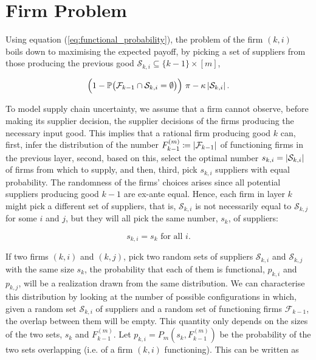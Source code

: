 \documentclass[../../main.tex]{subfiles}
\begin{document}
\section{Firm Problem}

Using equation (\ref{eq:functional_probability}), the problem of the firm $(k, i)$ boils down to maximising the expected payoff, by picking a set of suppliers from those producing the previous good $\mathcal{S}_{k, i} \subseteq \{k - 1\} \times [m]$, 

\begin{equation}
  \Big(1 - \mathbb{P}\big( \mathcal{F}_{k - 1} \cap \mathcal{S}_{k, i} = \emptyset \big) \Big) \ \pi  - \kappa \left\lvert\mathcal{S}_{k, i} \right\rvert.
\end{equation}


To model supply chain uncertainty, we assume that a firm cannot observe, before making its supplier decision, the supplier decisions of the firms producing the necessary input good. This implies that a rational firm producing good $k$ can, first, infer the distribution of the number $F^{(m)}_{k - 1} \coloneqq \left\lvert\mathcal{F}_{k - 1}\right\rvert$ of functioning firms in the previous layer, second, based on this, select the optimal number $s_{k, i} = \left\lvert\mathcal{S}_{k, i}\right\rvert$ of firms from which to supply, and then, third, pick $s_{k, i}$ suppliers with equal probability. The randomness of the firms' choices arises since all potential suppliers producing good $k - 1$ are ex-ante equal. Hence, each firm in layer $k$ might pick a different set of suppliers, that is, $\mathcal{S}_{k, i}$ is not necessarily equal to $\mathcal{S}_{k, j}$ for some $i$ and $j$, but they will all pick the same number, $s_k$, of suppliers:

\begin{equation}
  s_{k, i} = s_k \text{ for all } i.
\end{equation}

If two firms $(k, i)$ and $(k, j)$, pick two random sets of suppliers $\mathcal{S}_{k, i}$ and $\mathcal{S}_{k, j}$ with the same size $s_k$, the probability that each of them is functional, $p_{k, i}$ and $p_{k, j}$, will be a realization drawn from the same distribution. We can characterise this distribution by looking at the number of possible configurations in which, given a random set $\mathcal{S}_{k, i}$ of suppliers and a random set of functioning firms $\mathcal{F}_{k - 1}$, the overlap between them will be empty. This quantity only depends on the sizes of the two sets, $s_k$ and $F^{(m)}_{k-1}$. Let $p_{k, i} = P_m\left(s_k, F^{(m)}_{k - 1}\right)$ be the probability of the two sets overlapping (i.e. of a firm $(k, i)$ functioning). This can be written as 
\end{document}
